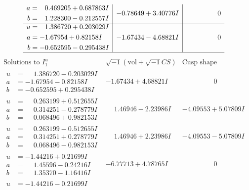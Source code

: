 \documentclass[1p]{elsarticle_modified}
\theoremstyle{definition}
\newcommand{\I}{\sqrt{-1}}
\begin{document}
$$\begin{array}{c|c|c}
\begin{aligned}
a &= \phantom{-}0.469205 + 0.687863 I \\
b &= \phantom{-}1.228300 - 0.212557 I\end{aligned}
 & -0.78649 + 3.40776 I & \phantom{-0.000000 } 0 \\ \hline\begin{aligned}
u &= \phantom{-}1.386720 + 0.203029 I \\
a &= -1.67954 + 0.82158 I \\
b &= -0.652595 - 0.295438 I\end{aligned}
 & -1.67434 - 4.68821 I & \phantom{-0.000000 } 0\\
 \hline 
 \end{array}$$\newpage$$\begin{array}{c|c|c}  
\text{Solutions to }I^u_{1}& \I (\text{vol} + \sqrt{-1}CS) & \text{Cusp shape}\\
 \hline 
\begin{aligned}
u &= \phantom{-}1.386720 - 0.203029 I \\
a &= -1.67954 - 0.82158 I \\
b &= -0.652595 + 0.295438 I\end{aligned}
 & -1.67434 + 4.68821 I & \phantom{-0.000000 } 0 \\ \hline\begin{aligned}
u &= \phantom{-}0.263199 + 0.512655 I \\
a &= \phantom{-}0.314251 - 0.278779 I \\
b &= \phantom{-}0.068496 + 0.982153 I\end{aligned}
 & \phantom{-}1.46946 - 2.23986 I & -4.09553 + 5.07809 I \\ \hline\begin{aligned}
u &= \phantom{-}0.263199 - 0.512655 I \\
a &= \phantom{-}0.314251 + 0.278779 I \\
b &= \phantom{-}0.068496 - 0.982153 I\end{aligned}
 & \phantom{-}1.46946 + 2.23986 I & -4.09553 - 5.07809 I \\ \hline\begin{aligned}
u &= -1.44216 + 0.21699 I \\
a &= \phantom{-}1.45596 - 0.24216 I \\
b &= \phantom{-}1.35370 - 1.16416 I\end{aligned}
 & -6.77713 + 4.78765 I & \phantom{-0.000000 } 0 \\ \hline\begin{aligned}
u &= -1.44216 - 0.21699 I \\

\end{aligned}
\end{array}$$
\end{document}
